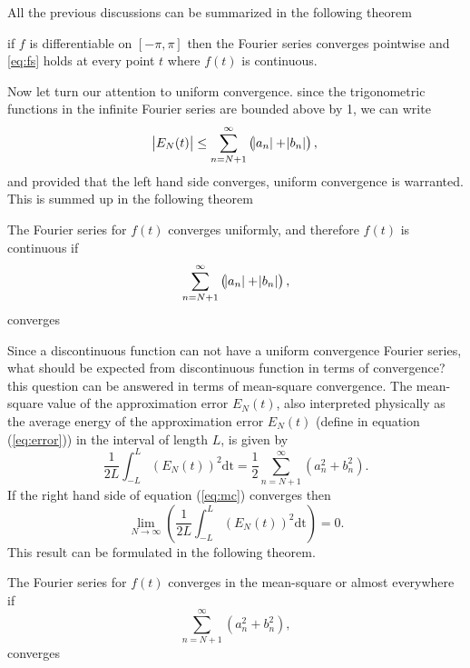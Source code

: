 \documentclass[../Main/thesis.tex]{subfiles}
\begin{document}
All the previous discussions can be summarized in the following theorem
\begin{theorem}
	if $f$ is differentiable on $[-\pi, \pi]$ then the Fourier series converges pointwise
	and \ref{eq:fs} holds at every point $t$ where $f(t)$ is continuous.
\end{theorem}
Now let turn our attention to uniform convergence.
since the trigonometric functions in the infinite Fourier series are bounded above by 1, we can write 
\begin{equation}
\abs{E_{N}(t)} \leq \sum_{n = N+1}^{\infty} \left(\abs{a_{n}} + \abs{b_{n}}\right),
\end{equation} 
and provided that the left hand side converges, uniform convergence is warranted. This is summed up in the following theorem
\begin{theorem}
	The Fourier series for $f(t)$ converges uniformly, and therefore $f(t)$ is continuous if
	 \begin{equation}
	  \sum_{n = N+1}^{\infty} \left(\abs{a_{n}} + \abs{b_{n}}\right),
	 \end{equation}
	 converges
\end{theorem}
Since a discontinuous function can not have a uniform convergence Fourier series, what should be expected from discontinuous function in terms of convergence? this question can be answered in terms of mean-square convergence.
The mean-square value of the approximation error $E_{N}(t)$, also interpreted physically as the average energy of the approximation error $E_{N}(t)$ (define in equation (\ref{eq:error})) in the interval of length $L$, is given by 
\begin{equation}\label{eq:mc}
	\frac{1}{2L}\int_{-L}^{L}\left(E_{N}(t)\right)^{2}\mathrm{dt} = \frac{1}{2}\sum_{n=N+1}^{\infty}\left(a_{n}^{2} + b_{n}^{2}\right).
\end{equation}
If the right hand side of equation (\ref{eq:mc}) converges then 
\begin{equation}
	\lim_{N\rightarrow \infty}\left( \frac{1}{2L}\int_{-L}^{L}\left(E_{N}(t)\right)^{2}\mathrm{dt}  \right) = 0.
\end{equation}
This result can be formulated in the following theorem.
\begin{theorem}\label{thm:msc}
	The Fourier series for $f(t)$ converges in the mean-square or almost everywhere if 
	\begin{equation}
	\sum_{n=N+1}^{\infty}\left(a_{n}^{2} + b_{n}^{2}\right),
	\end{equation}
	converges
\end{theorem}
\end{document}
